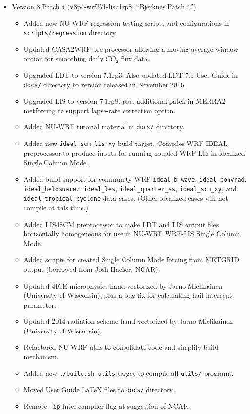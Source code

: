 \begin{itemize}
\item Version 8 Patch 4 (v8p4-wrf371-lis71rp8; ``Bjerknes Patch 4'')
  \begin{itemize}
  \item Added new NU-WRF regression testing scripts and configurations in
  \texttt{scripts/regression} directory.
  \item Updated CASA2WRF pre-processor allowing a moving average window
  option for smoothing daily $CO_2$ flux data.
  \item  Upgraded LDT to version 7.1rp3.  Also updated LDT 7.1 User Guide
    in \texttt{docs/} directory to version released in November 2016.    
  \item Upgraded LIS to version 7.1rp8, plus additional patch in MERRA2
    metforcing to support lapse-rate correction option.
  \item Added NU-WRF tutorial material in \texttt{docs/} directory.
  \item Added new \texttt{ideal\_scm\_lis\_xy} build target.  Compiles WRF 
    IDEAL preprocessor to produce inputs for running coupled WRF-LIS in 
    idealized Single Column Mode.
  \item Added build support for community WRF \texttt{ideal\_b\_wave}, 
    \texttt{ideal\_convrad}, \texttt{ideal\_heldsuarez}, \texttt{ideal\_les},
    \texttt{ideal\_quarter\_ss}, \texttt{ideal\_scm\_xy}, and
    \texttt{ideal\_tropical\_cyclone} data cases.  (Other idealized cases
    will not compile at this time.)
  \item Added LIS4SCM preprocessor to make LDT and LIS output files 
    horizontally homogeneous for use in NU-WRF WRF-LIS Single Column Mode.
  \item Added scripts for created Single Column Mode forcing from METGRID
    output (borrowed from Josh Hacker, NCAR).
  \item Updated 4ICE microphysics hand-vectorized by Jarno Mielikainen 
    (University of Wisconsin), plus a bug fix for calculating hail intercept
    parameter.
  \item Updated 2014 radiation scheme hand-vectorized by Jarno Mielikainen
    (University of Wisconsin).
  \item Refactored NU-WRF utils to consolidate code and simplify build 
    mechanism.
  \item Added new \texttt{./build.sh utils} target to compile all 
    \texttt{utils/} programs.
  \item Moved User Guide LaTeX files to \texttt{docs/} directory.
  \item Remove \texttt{-ip} Intel compiler flag at suggestion of NCAR.
  \end{itemize}
      

\end{itemize}
